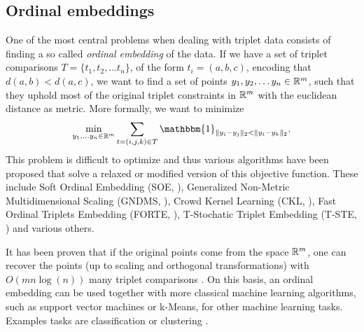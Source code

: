 \subsection{Ordinal embeddings}
One of the most central problems when dealing with triplet data consists of finding a so called \textit{ordinal embedding} of the data. If we have a set of triplet comparisons $T = \{t_1, t_2, \ldots t_n\}$, 
of the form $t_i = \left( a,b,c \right)$, encoding that $d(a,b) < d(a,c)$, 
we want to find a set of points $y_1, y_2, \ldots y_n \in \mathbb{R}^{m}$, such that they uphold most of the original triplet constraints in $\mathbb{R}^{m}$ with the euclidean distance
as metric. More formally, we want to minimize \citep{vankadaraInsightsOrdinalEmbedding2021}
\begin{align*}
    \min_{y_1, \ldots y_n \in \R^{m}} \sum_{t=\left( i,j,k \right)  \in T} \mathbbm{1}_{ \|y_i - y_j\|_2 < \|y_i - y_k\|_2 }
.\end{align*}
This problem is difficult to optimize and thus various algorithms have been proposed that solve a relaxed or modified version of this objective function. 
These include Soft Ordinal Embedding  (SOE, \cite{teradaLocalOrdinalEmbedding2014}), Generalized Non-Metric Multidimensional Scaling (GNDMS, \cite{agarwalGeneralizedNonmetricMultidimensional2007}), 
Crowd Kernel Learning (CKL, \cite{tamuzAdaptivelyLearningCrowd2011}), Fast Ordinal Triplets Embedding (FORTE, \cite{jainFiniteSamplePrediction2016}),
T-Stochatic Triplet Embedding (T-STE, \cite{laurensvandermaatenStochasticTripletEmbedding2012}) and various others. 

It has been proven that if the original points come from the space $\mathbb{R}^{m}$, one can recover the points (up to scaling and orthogonal transformations) with $O(mn\log(n))$ many triplet comparisons
\citep{jainFiniteSamplePrediction2016}. On this basis, an ordinal embedding can be used together with more classical machine learning algorithms, such as support vector machines or k-Means,
for other machine learning tasks. Examples tasks are classification \citep{tamuzAdaptivelyLearningCrowd2011, kleindessnerLensDepthFunction2017} or clustering \citep{kleindessnerLensDepthFunction2017}.

